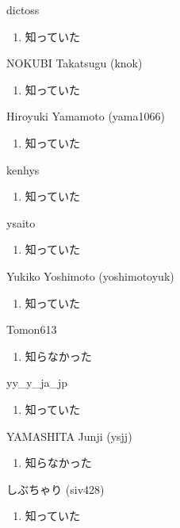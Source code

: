 \begin{prework}{ dictoss }
  \begin{enumerate}
  \item 知っていた
  \end{enumerate}
\end{prework}

\begin{prework}{ NOKUBI Takatsugu (knok) }
  \begin{enumerate}
  \item 知っていた
  \end{enumerate}
\end{prework}

\begin{prework}{ Hiroyuki Yamamoto (yama1066) }
  \begin{enumerate}
  \item 知っていた
  \end{enumerate}
\end{prework}

\begin{prework}{ kenhys }
  \begin{enumerate}
  \item 知っていた
  \end{enumerate}
\end{prework}

\begin{prework}{ ysaito }
  \begin{enumerate}
  \item 知っていた
  \end{enumerate}
\end{prework}

\begin{prework}{ Yukiko Yoshimoto (yoshimotoyuk) }
  \begin{enumerate}
  \item 知っていた
  \end{enumerate}
\end{prework}

\begin{prework}{ Tomon613 }
  \begin{enumerate}
  \item 知らなかった
  \end{enumerate}
\end{prework}

\begin{prework}{ yy\_y\_ja\_jp }
  \begin{enumerate}
  \item 知っていた
  \end{enumerate}
\end{prework}

\begin{prework}{ YAMASHITA Junji (ysjj) }
  \begin{enumerate}
  \item 知らなかった
  \end{enumerate}
\end{prework}

\begin{prework}{ しぶちゃり (siv428) }
  \begin{enumerate}
  \item 知っていた
  \end{enumerate}
\end{prework}
